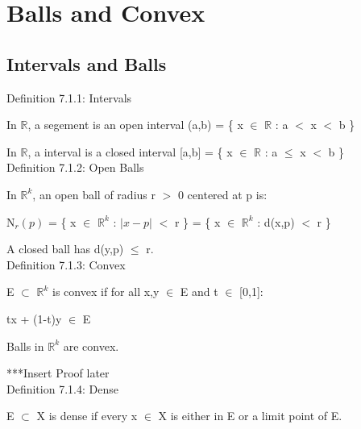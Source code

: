 \newpage

\section[Day 7: Balls and Convex]{ Balls and Convex }

\subsection{ Intervals and Balls } 

{ \color{blue} Definition 7.1.1: Intervals } 

	\begin{adjustbox}{minipage=14cm, right, vspace=0.2cm 0cm}
		In $\mathbb{R}$, a segement is an open interval (a,b) = \{ x $\in$ $\mathbb{R}$ : a $<$ x $<$ b \}

		In $\mathbb{R}$, a interval is a closed interval [a,b] = \{ x $\in$ $\mathbb{R}$ : a $\leq$ x $<$ b \} \\
	\end{adjustbox}

{ \color{blue} Definition 7.1.2: Open Balls } 

	\begin{adjustbox}{minipage=14cm, right, vspace=0.2cm 0cm}
		In $\mathbb{R}^k$, an open ball of radius r $>$ 0 centered at p is:

		\qquad N$_r(p)$ = \{ x $\in$ $\mathbb{R}^k$ : $|x-p|$ $<$ r \}
		= \{ x $\in$ $\mathbb{R}^k$ : d(x,p) $<$ r \}

		A closed ball has d(y,p) $\leq$ r. \\
	\end{adjustbox}

{ \color{blue} Definition 7.1.3: Convex } 

	\begin{adjustbox}{minipage=14cm, right, vspace=0.2cm 0cm}
		E $\subset$ $\mathbb{R}^k$ is convex if for all
		x,y $\in$ E and t $\in$ [0,1]:

		\qquad tx + (1-t)y $\in$ E

		Balls in $\mathbb{R}^k$ are convex.

		{\color{purple} ***Insert Proof later} \\
	\end{adjustbox}

{ \color{blue} Definition 7.1.4: Dense } 

	\begin{adjustbox}{minipage=14cm, right, vspace=0.2cm 0cm}
		E $\subset$ X is dense if every x $\in$ X is either in E or
		a limit point of E. \\
	\end{adjustbox}

